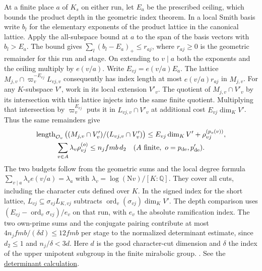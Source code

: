 At a finite place \(a\) of \(K_s\) on either run, let \(E_a\) be
the prescribed ceiling, which bounds the product depth in the
geometric index theorem. In a local Smith basis write \(b_l\) for
the elementary exponents of the product lattice in the canonical
lattice. Apply the all-subspace bound at \(a\) to the span of the
basis vectors with \(b_l>E_a\). The bound gives
\(\sum_l(b_l-E_a)_+\le r_{aj}\), where \(r_{aj}\ge0\) is the
geometric remainder for this run and stage. On extending to \(v\mid a\)
both the exponents and the ceiling multiply by \(e(v/a)\). Write
\(E_{vj}=e(v/a)E_a\). The lattice
\(M_{j,v}\cap\varpi_v^{-E_{vj}}L_{vj,v}\) consequently has index
length at most \(e(v/a)r_{aj}\) in \(M_{j,v}\). For any \(K\)-subspace
\(V'\), work in its local extension \(V'_v\). The quotient of
\(M_{j,v}\cap V'_v\) by its intersection with this lattice injects into
the same finite quotient. Multiplying that intersection by
\(\varpi_v^{E_{vj}}\) puts it in \(L_{vj,v}\cap V'_v\) at additional
cost \(E_{vj}\dim_K V'\). Thus the same remainders give
\[
 \begin{gathered}
 \operatorname{length}_{\mathcal O_v}
   \big((M_{j,v}\cap V'_v)/(L_{vj,v}\cap V'_v)\big)
     \le E_{vj}\dim_K V'+\rho_{vj}^{(p_o(v))},\\
 \sum_{v\in A}\lambda_v\rho_{vj}^{(o)}\le n_j fmb\,d_2
    \quad (A\text{ finite},\ o=p_{\rm de},p'_{\rm de}).
 \end{gathered}
\]
The two budgets follow from the geometric sums and the local degree
formula \(\sum_{v\mid a}\lambda_v e(v/a)=\lambda_a\) with
\(\lambda_v=\log(\mathrm{N}v)/[K:\mathbb Q]\). They cover all cuts,
including the character cuts defined over \(K\). In the signed index
for the short lattice, \(L_{vj}\subseteq\sigma_{vj}L_{K,vj}\)
subtracts \(\operatorname{ord}_v(\sigma_{vj})\dim_K V'\). The depth
comparison uses \((E_{vj}-\operatorname{ord}_v\sigma_{vj})/e_v\) on
that run, with \(e_v\) the absolute ramification index. The two own-prime sums
and the conjugate pairing contribute at most
\(4n_j fmb/(\delta d)\le12 fmb\) per stage to the normalized
determinant estimate, since \(d_2\le1\) and \(n_j/\delta<3d\).
Here \(d\) is the good character-cut dimension and \(\delta\) the
index of the upper unipotent subgroup in the finite mirabolic group.
.
See the \hyperlink{proof.near-level-transport}{determinant calculation}.

